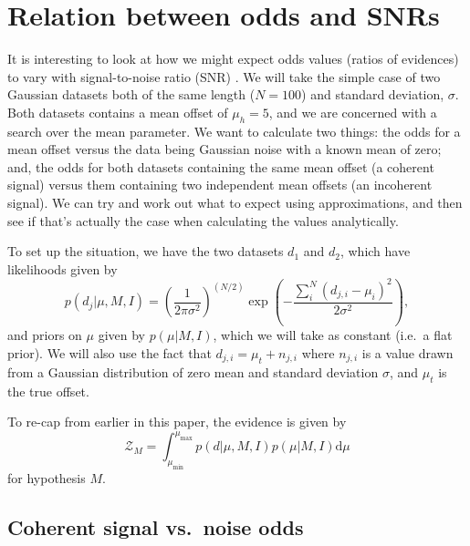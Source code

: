 \section{Relation between odds and SNRs}\label{app:oddratios}

It is interesting to look at how we might expect odds values (ratios of evidences) to vary with signal-to-noise ratio (SNR) \citep[also
see similar discussions in][]{MaxCWpolariations}. We will take the simple case of two Gaussian
datasets both of the same length ($N = 100$) and standard deviation, $\sigma$. Both datasets contains a mean offset of $\mu_h = 5$, and we are concerned with a
search over the mean parameter. We want to calculate two things: the odds for a mean offset versus the data being Gaussian noise with a known mean of zero; and,
the odds for both datasets containing the same mean offset (a coherent signal) versus them containing two independent mean offsets (an incoherent signal). We can
try and work out what to expect using approximations, and then see if that's actually the case when calculating the values analytically.

To set up the situation, we have the two datasets $d_1$ and $d_2$, which have likelihoods given by
\begin{equation}
 p(d_j|\mu,M,I) = \left(\frac{1}{2\pi\sigma^2}\right)^{(N/2)} \exp{\left(-\frac{\sum_i^N (d_{j,i}-\mu_i)^2}{2\sigma^2}\right)},
\end{equation}
and priors on $\mu$ given by $p(\mu|M,I)$, which we will take as constant (i.e.\ a flat prior). We will also use the fact that $d_{j,i} = \mu_t + n_{j,i}$
where $n_{j,i}$ is a value drawn from a Gaussian distribution of zero mean and standard deviation $\sigma$, and $\mu_t$ is the true offset.

To re-cap from earlier in this paper, the evidence is given by
\begin{equation}
\mathcal{Z}_M = \int_{\mu_{\text{min}}}^{\mu_{\text{max}}} p(d|\mu, M, I) p(\mu|M,I) {\text{d}\mu}
\end{equation}
for hypothesis $M$.

\subsection{Coherent signal vs.\ noise odds}

